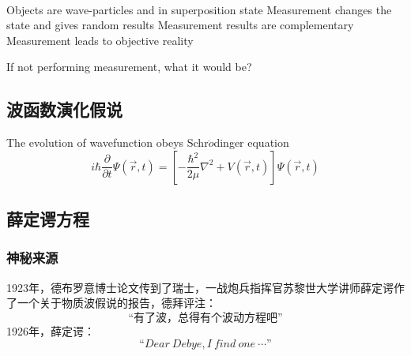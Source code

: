 \begin{frame}
    \begin{tcolorbox4}[Conclusion]
        ~~\\
    \begin{enumerate}
        \Item Objects are wave-particles and in superposition state
        \Item Measurement changes the state and gives random results
        \Item Measurement results are complementary
        \Item Measurement leads to objective reality
    \end{enumerate}
    \end{tcolorbox4}
\end{frame}  

\begin{frame}
    \centering
    {
      If not performing measurement, what it would be? 
    }
\end{frame}

\subsection{波函数演化假说}

\begin{frame}
    \begin{tcolorbox4}
        The evolution of wavefunction obeys Schr$\ddot{o}$dinger equation
        \begin{equation*}
            i\hbar \frac{\partial }{\partial t} \Psi (\overrightarrow{r},t ) =\left [ -\frac{\hbar^2}{2\mu }\nabla ^2 + V(\overrightarrow{r},t ) \right ]\Psi (\overrightarrow{r}, t ) 
        \end{equation*}
    \end{tcolorbox4}
\end{frame}

\subsection{薛定谔方程}

\begin{frame}
    \frametitle{神秘来源}
    \begin{itemize}
        \Item 1923年，德布罗意博士论文传到了瑞士，一战炮兵指挥官苏黎世大学讲师薛定谔作了一个关于物质波假说的报告，德拜评注：\\
        $$\text{“有了波，总得有个波动方程吧”}$$
        \Item 1926年，薛定谔：
        $$“Dear~Debye, I~find~one~\cdots”$$
    \end{itemize}            
\end{frame}

